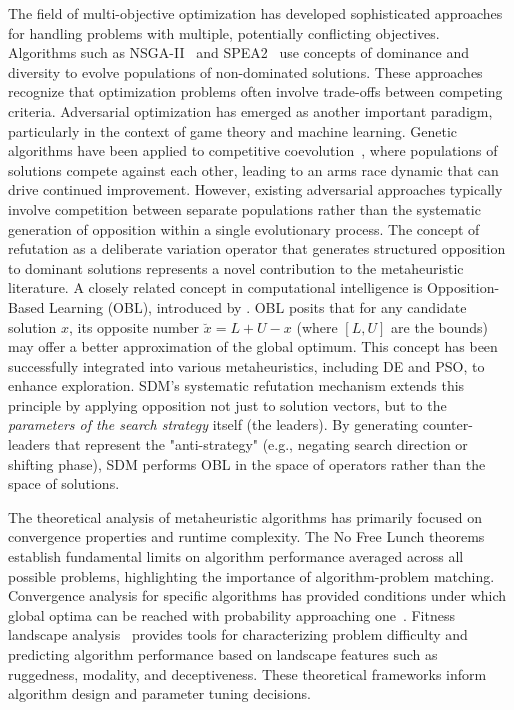 \documentclass[11pt]{article}
\begin{document}
The field of multi-objective optimization has developed sophisticated approaches for handling problems with multiple, potentially conflicting objectives. Algorithms such as NSGA-II~\citep{deb2002fast} and SPEA2~\citep{zitzler2001spea2} use concepts of dominance and diversity to evolve populations of non-dominated solutions. These approaches recognize that optimization problems often involve trade-offs between competing criteria.
Adversarial optimization has emerged as another important paradigm, particularly in the context of game theory and machine learning. Genetic algorithms have been applied to competitive coevolution~\citep{hillis1990co}, where populations of solutions compete against each other, leading to an arms race dynamic that can drive continued improvement.
However, existing adversarial approaches typically involve competition between separate populations rather than the systematic generation of opposition within a single evolutionary process. The concept of refutation as a deliberate variation operator that generates structured opposition to dominant solutions represents a novel contribution to the metaheuristic literature.
A closely related concept in computational intelligence is Opposition-Based Learning (OBL), introduced by \cite{tizhoosh2005opposition}. OBL posits that for any candidate solution $x$, its opposite number $\breve{x} = L + U - x$ (where $[L, U]$ are the bounds) may offer a better approximation of the global optimum. This concept has been successfully integrated into various metaheuristics, including DE and PSO, to enhance exploration. SDM's systematic refutation mechanism extends this principle by applying opposition not just to solution vectors, but to the \textit{parameters of the search strategy} itself (the leaders). By generating counter-leaders that represent the "anti-strategy" (e.g., negating search direction or shifting phase), SDM performs OBL in the space of operators rather than the space of solutions.



The theoretical analysis of metaheuristic algorithms has primarily focused on convergence properties and runtime complexity. The No Free Lunch theorems~\citep{wolpert1997no} establish fundamental limits on algorithm performance averaged across all possible problems, highlighting the importance of algorithm-problem matching. Convergence analysis for specific algorithms has provided conditions under which global optima can be reached with probability approaching one~\citep{rudolph1994convergence}.
Fitness landscape analysis~\citep{malan2013survey} provides tools for characterizing problem difficulty and predicting algorithm performance based on landscape features such as ruggedness, modality, and deceptiveness. These theoretical frameworks inform algorithm design and parameter tuning decisions.
\end{document}
